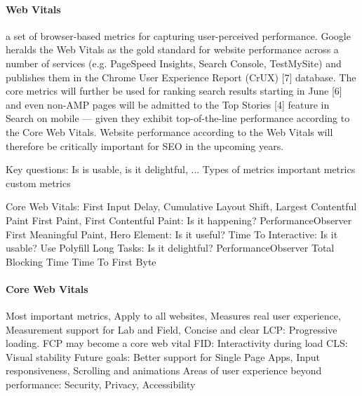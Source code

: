 \paragraph{Web Vitals}


a set of browser-based metrics for capturing user-perceived performance. Google heralds the Web Vitals as the gold standard for website performance across a number of services (e.g. PageSpeed Insights, Search Console, TestMySite) and publishes them in the Chrome User Experience Report (CrUX) [7] database. The core metrics will further be used for ranking search results starting in June [6] and even non-AMP pages will be admitted to the Top Stories [4] feature in Search on mobile — given they exhibit top-of-the-line performance according to the Core Web Vitals. Website performance according to the Web Vitals will therefore be critically important for SEO in the upcoming years.





 Key questions: Is is usable, is it delightful, ...
 Types of metrics
 important metrics
 custom metrics


 Core Web Vitals: First Input Delay, Cumulative Layout Shift, Largest Contentful Paint
 First Paint, First Contentful Paint: Is it happening? PerformanceObserver
 First Meaningful Paint, Hero Element: Is it useful? 
 Time To Interactive: Is it usable? Use Polyfill
 Long Tasks: Is it delightful? PerformanceObserver
 Total Blocking Time
 Time To First Byte



\paragraph{Core Web Vitals}


 Most important metrics, Apply to all websites, Measures real user experience, Measurement support for Lab and Field, Concise and clear
 LCP: Progressive loading. FCP may become a core web vital
 FID: Interactivity during load
 CLS: Visual stability
 Future goals: Better support for Single Page Apps, Input responsiveness, Scrolling and animations
 Areas of user experience beyond performance: Security, Privacy, Accessibility



